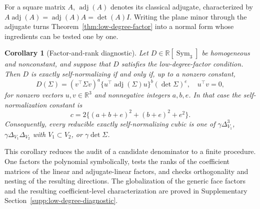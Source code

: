 \documentclass[12pt,a4paper]{article}
\theoremstyle{plain}
\newtheorem{corollary}{Corollary}
\theoremstyle{definition}
\newcommand{\R}{\mathbb{R}}
\newcommand{\Sym}{\operatorname{Sym}}
\newcommand{\adjm}{\operatorname{adj}}
\begin{document}
For a square matrix $A$, $\adjm(A)$ denotes its classical adjugate, characterized by $A\adjm(A)=\adjm(A)A=\det(A)I$.
Writing the plane minor through the adjugate turns Theorem~\ref{thm:low-degree-factor} into a normal form whose ingredients can be tested one by one.
\begin{corollary}[Factor-and-rank diagnostic]
\label{cor:factor-diagnostic}
    Let $D\in\R[\Sym_3]$ be homogeneous and nonconstant, and suppose that $D$ satisfies the low-degree-factor condition.
    Then $D$ is exactly self-normalizing if and only if, up to a nonzero constant,
    \begin{equation}
    \label{eq:factor-diagnostic}
        D(\Sigma)
        =
        (v^\top\Sigma v)^a
        \{u^\top\adjm(\Sigma)u\}^b(\det\Sigma)^e
        ,
        \quad
        u^\top v=0
        ,
    \end{equation}
    for nonzero vectors $u,v\in\R^3$ and nonnegative integers $a,b,e$.
    In that case the self-normalization constant is
    \begin{equation}
    \label{eq:diagnostic-c}
        c
        =
        2\{(a+b+e)^2+(b+e)^2+e^2\}
        .
    \end{equation}
    Consequently, every reducible exactly self-normalizing cubic is one of $\gamma\Delta_{V_1}^3$, $\gamma\Delta_{V_1}\Delta_{V_2}$ with $V_1\subset V_2$, or $\gamma\det\Sigma$.
\end{corollary}

This corollary reduces the audit of a candidate denominator to a finite procedure.
One factors the polynomial symbolically, tests the ranks of the coefficient matrices of the linear and adjugate-linear factors, and checks orthogonality and nesting of the resulting directions.
The globalization of the generic face factors and the resulting coefficient-level characterization are proved in Supplementary Section~\ref{supp:low-degree-diagnostic}.
\end{document}
